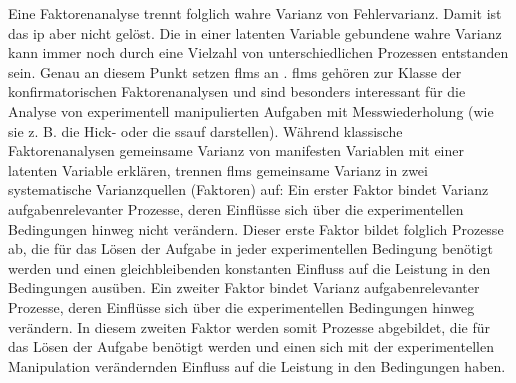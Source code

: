 \documentclass[11pt, twoside, a4paper]{book}		%
\begin{document}
Eine Faktorenanalyse trennt folglich wahre Varianz von Fehlervarianz. Damit ist das \gls{ip} aber nicht gelöst. Die in einer latenten Variable gebundene wahre Varianz kann immer noch durch eine Vielzahl von unterschiedlichen Prozessen entstanden sein. Genau an diesem Punkt setzen \glspl{flm} an \citep[z. B.][]{Schweizer2006a, Schweizer2006b, Schweizer2007, Schweizer2008, Schweizer2009a}. \glspl{flm} gehören zur Klasse der konfirmatorischen Faktorenanalysen und sind besonders interessant für die Analyse von experimentell manipulierten Aufgaben mit Messwiederholung (wie sie z. B. die Hick- oder die \gls{ssauf} darstellen). Während klassische Faktorenanalysen gemeinsame Varianz von manifesten Variablen mit einer latenten Variable erklären, trennen \glspl{flm} gemeinsame Varianz in zwei systematische Varianzquellen (Faktoren) auf: 
Ein erster Faktor bindet Varianz aufgabenrelevanter Prozesse, deren Einflüsse sich über die experimentellen Bedingungen hinweg nicht verändern. Dieser erste Faktor bildet folglich Prozesse ab, die für das Lösen der Aufgabe in jeder experimentellen Bedingung benötigt werden und einen gleichbleibenden konstanten Einfluss auf die Leistung in den Bedingungen ausüben. 
Ein zweiter Faktor bindet Varianz aufgabenrelevanter Prozesse, deren Einflüsse sich über die experimentellen Bedingungen hinweg verändern. In diesem zweiten Faktor werden somit Prozesse abgebildet, die für das Lösen der Aufgabe benötigt werden und einen sich mit der experimentellen Manipulation verändernden Einfluss auf die Leistung in den Bedingungen haben.

\end{document}
